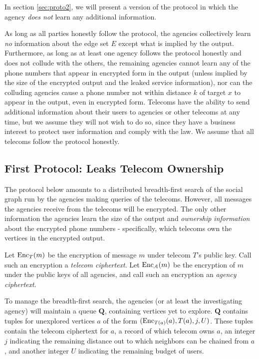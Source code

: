 In section \ref{sec:proto2}, we will present a version of the protocol in which the agency \emph{does not} learn any additional information.

As long as all parties honestly follow the protocol, the agencies collectively learn \emph{no} information about the edge set $E$ except what is implied by the output. Furthermore, as long as at least one agency follows the protocol honestly and does not collude with the others, the remaining agencies cannot learn any of the phone numbers that appear in encrypted form in the output (unless implied by the size of the encrypted output and the leaked service information), nor can the colluding agencies cause a phone number not within distance $k$ of target $x$ to appear in the output, even in encrypted form. Telecoms have the ability to send additional information about their users to agencies or other telecoms at any time, but we assume they will not wish to do so, since they have a business interest to protect user information and comply with the law. We assume that all telecoms follow the protocol honestly.

\subsection{First Protocol: Leaks Telecom Ownership}
\label{sec:proto1}

The protocol below amounts to a distributed breadth-first search of the social graph run by the agencies making queries of the telecoms. However, all messages the agencies receive from the telecoms will be encrypted. The only other information the agencies learn the size of the output and \emph{ownership information} about the encrypted phone numbers - specifically, which telecoms own the vertices in the encrypted output.

Let $\operatorname{Enc}_T(m)$ be the encryption of message $m$ under telecom $T$'s public key. Call such an encryption a \emph{telecom ciphertext}. Let $\operatorname{Enc}_\mathcal{A}(m)$ be the encryption of $m$ under the public keys of all agencies, and call such an encryption an \emph{agency ciphertext}.

To manage the breadth-first search, the agencies (or at least the investigating agency) will maintain a queue $\mathbf{Q}$, containing vertices yet to explore. $\mathbf{Q}$ contains tuples for unexplored vertices $a$ of the form $(\operatorname{Enc}_{T(a)}(a), T(a), j, U)$. These tuples contain the telecom ciphertext for $a$, a record of which telecom owns $a$, an integer $j$ indicating the remaining distance out to which neighbors can be chained from $a$, and another integer $U$ indicating the remaining budget of users.

